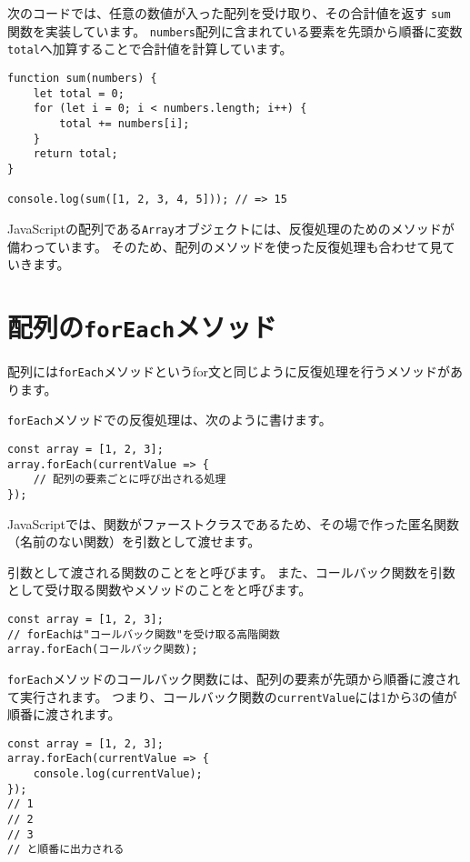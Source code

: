 次のコードでは、任意の数値が入った配列を受け取り、その合計値を返す
\texttt{sum} 関数を実装しています。
\texttt{numbers}配列に含まれている要素を先頭から順番に変数\texttt{total}へ加算することで合計値を計算しています。

\begin{lstlisting}
function sum(numbers) {
    let total = 0;
    for (let i = 0; i < numbers.length; i++) {
        total += numbers[i];
    }
    return total;
}

console.log(sum([1, 2, 3, 4, 5])); // => 15
\end{lstlisting}

JavaScriptの配列である\texttt{Array}オブジェクトには、反復処理のためのメソッドが備わっています。
そのため、配列のメソッドを使った反復処理も合わせて見ていきます。

\hypertarget{array-foreach}{%
\section{\texorpdfstring{配列の\texttt{forEach}メソッド}{配列のforEachメソッド}}\label{array-foreach}}

配列には\texttt{forEach}メソッドというfor文と同じように反復処理を行うメソッドがあります。

\texttt{forEach}メソッドでの反復処理は、次のように書けます。

\begin{lstlisting}
const array = [1, 2, 3];
array.forEach(currentValue => {
    // 配列の要素ごとに呼び出される処理
});
\end{lstlisting}

JavaScriptでは、関数がファーストクラスであるため、その場で作った匿名関数（名前のない関数）を引数として渡せます。

引数として渡される関数のことを\textbf{}と呼びます。
また、コールバック関数を引数として受け取る関数やメソッドのことを\textbf{}と呼びます。

\begin{lstlisting}
const array = [1, 2, 3];
// forEachは"コールバック関数"を受け取る高階関数
array.forEach(コールバック関数);
\end{lstlisting}

\texttt{forEach}メソッドのコールバック関数には、配列の要素が先頭から順番に渡されて実行されます。
つまり、コールバック関数の\texttt{currentValue}には1から3の値が順番に渡されます。

\begin{lstlisting}
const array = [1, 2, 3];
array.forEach(currentValue => {
    console.log(currentValue);
});
// 1
// 2
// 3
// と順番に出力される
\end{lstlisting}

